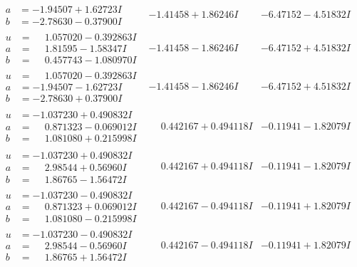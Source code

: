 \documentclass[1p]{elsarticle_modified}
\theoremstyle{definition}
\begin{document}
$$\begin{array}{c|c|c}
\begin{aligned}
a &= -1.94507 + 1.62723 I \\
b &= -2.78630 - 0.37900 I\end{aligned}
 & -1.41458 + 1.86246 I & -6.47152 - 4.51832 I \\ \hline\begin{aligned}
u &= \phantom{-}1.057020 - 0.392863 I \\
a &= \phantom{-}1.81595 - 1.58347 I \\
b &= \phantom{-}0.457743 - 1.080970 I\end{aligned}
 & -1.41458 - 1.86246 I & -6.47152 + 4.51832 I \\ \hline\begin{aligned}
u &= \phantom{-}1.057020 - 0.392863 I \\
a &= -1.94507 - 1.62723 I \\
b &= -2.78630 + 0.37900 I\end{aligned}
 & -1.41458 - 1.86246 I & -6.47152 + 4.51832 I \\ \hline\begin{aligned}
u &= -1.037230 + 0.490832 I \\
a &= \phantom{-}0.871323 - 0.069012 I \\
b &= \phantom{-}1.081080 + 0.215998 I\end{aligned}
 & \phantom{-}0.442167 + 0.494118 I & -0.11941 - 1.82079 I \\ \hline\begin{aligned}
u &= -1.037230 + 0.490832 I \\
a &= \phantom{-}2.98544 + 0.56960 I \\
b &= \phantom{-}1.86765 - 1.56472 I\end{aligned}
 & \phantom{-}0.442167 + 0.494118 I & -0.11941 - 1.82079 I \\ \hline\begin{aligned}
u &= -1.037230 - 0.490832 I \\
a &= \phantom{-}0.871323 + 0.069012 I \\
b &= \phantom{-}1.081080 - 0.215998 I\end{aligned}
 & \phantom{-}0.442167 - 0.494118 I & -0.11941 + 1.82079 I \\ \hline\begin{aligned}
u &= -1.037230 - 0.490832 I \\
a &= \phantom{-}2.98544 - 0.56960 I \\
b &= \phantom{-}1.86765 + 1.56472 I\end{aligned}
 & \phantom{-}0.442167 - 0.494118 I & -0.11941 + 1.82079 I \\ \hline\begin{aligned}

\end{aligned}
\end{array}$$
\end{document}
